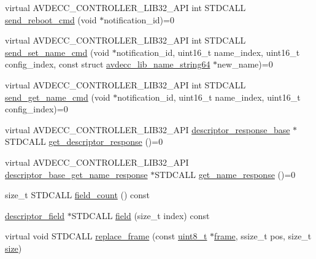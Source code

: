 \begin{DoxyCompactItemize}
\item 
virtual A\+V\+D\+E\+C\+C\+\_\+\+C\+O\+N\+T\+R\+O\+L\+L\+E\+R\+\_\+\+L\+I\+B32\+\_\+\+A\+PI int S\+T\+D\+C\+A\+LL \hyperlink{classavdecc__lib_1_1descriptor__base_a1618412a9b3d57a12044030b31cfd5a3}{send\+\_\+reboot\+\_\+cmd} (void $\ast$notification\+\_\+id)=0
\item 
virtual A\+V\+D\+E\+C\+C\+\_\+\+C\+O\+N\+T\+R\+O\+L\+L\+E\+R\+\_\+\+L\+I\+B32\+\_\+\+A\+PI int S\+T\+D\+C\+A\+LL \hyperlink{classavdecc__lib_1_1descriptor__base_a6a8c227d7a202f251c689107df7ede0b}{send\+\_\+set\+\_\+name\+\_\+cmd} (void $\ast$notification\+\_\+id, uint16\+\_\+t name\+\_\+index, uint16\+\_\+t config\+\_\+index, const struct \hyperlink{structavdecc__lib_1_1avdecc__lib__name__string64}{avdecc\+\_\+lib\+\_\+name\+\_\+string64} $\ast$new\+\_\+name)=0
\item 
virtual A\+V\+D\+E\+C\+C\+\_\+\+C\+O\+N\+T\+R\+O\+L\+L\+E\+R\+\_\+\+L\+I\+B32\+\_\+\+A\+PI int S\+T\+D\+C\+A\+LL \hyperlink{classavdecc__lib_1_1descriptor__base_a27ba9959456de53a8de18eead74806f7}{send\+\_\+get\+\_\+name\+\_\+cmd} (void $\ast$notification\+\_\+id, uint16\+\_\+t name\+\_\+index, uint16\+\_\+t config\+\_\+index)=0
\item 
virtual A\+V\+D\+E\+C\+C\+\_\+\+C\+O\+N\+T\+R\+O\+L\+L\+E\+R\+\_\+\+L\+I\+B32\+\_\+\+A\+PI \hyperlink{classavdecc__lib_1_1descriptor__response__base}{descriptor\+\_\+response\+\_\+base} $\ast$S\+T\+D\+C\+A\+LL \hyperlink{classavdecc__lib_1_1descriptor__base_ac64e6a5ee8781eeb9c781953e845b1be}{get\+\_\+descriptor\+\_\+response} ()=0
\item 
virtual A\+V\+D\+E\+C\+C\+\_\+\+C\+O\+N\+T\+R\+O\+L\+L\+E\+R\+\_\+\+L\+I\+B32\+\_\+\+A\+PI \hyperlink{classavdecc__lib_1_1descriptor__base__get__name__response}{descriptor\+\_\+base\+\_\+get\+\_\+name\+\_\+response} $\ast$S\+T\+D\+C\+A\+LL \hyperlink{classavdecc__lib_1_1descriptor__base_aba4bf8a81f90f5bf00d5c8b5a7330145}{get\+\_\+name\+\_\+response} ()=0
\item 
size\+\_\+t S\+T\+D\+C\+A\+LL \hyperlink{classavdecc__lib_1_1descriptor__base__imp_a9b98d4f427a6c527e9080c938cfa9334}{field\+\_\+count} () const 
\item 
\hyperlink{classavdecc__lib_1_1descriptor__field}{descriptor\+\_\+field} $\ast$S\+T\+D\+C\+A\+LL \hyperlink{classavdecc__lib_1_1descriptor__base__imp_a5f8127d32e2aa54777ca03bf09e8d7b5}{field} (size\+\_\+t index) const 
\item 
virtual void S\+T\+D\+C\+A\+LL \hyperlink{classavdecc__lib_1_1descriptor__base__imp_a482fe95208e9e14885e28e73e7be2c49}{replace\+\_\+frame} (const \hyperlink{stdint_8h_aba7bc1797add20fe3efdf37ced1182c5}{uint8\+\_\+t} $\ast$\hyperlink{gst__avb__playbin_8c_ac8e710e0b5e994c0545d75d69868c6f0}{frame}, ssize\+\_\+t pos, size\+\_\+t \hyperlink{gst__avb__playbin_8c_a439227feff9d7f55384e8780cfc2eb82}{size})

\end{DoxyCompactItemize}

